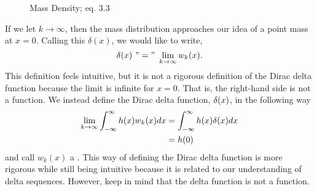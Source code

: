 \begin{figure}
    \centering
    \caption{Mass Density;  eq. 3.3}
\end{figure}

If we let \(k \rightarrow \infty\), then the mass distribution approaches our idea of a point mass at \(x=0\). Calling this \(\delta(x)\), we would like to write,
\begin{equation} \label{eq:deltaSeqLim}
    \delta(x)\ "="\ \lim_{k\rightarrow \infty} w_k(x).
\end{equation}
This definition feels intuitive, but it is not a rigorous definition of the Dirac delta function because the limit is infinite for \(x=0\). That is, the right-hand side is not a function. We instead define the Dirac delta function, \(\delta(x)\), in the following way
\begin{equation}
    \begin{split}
        \lim_{k\rightarrow \infty}\int_{-\infty}^{\infty} h(x)w_k(x)dx &= \int_{-\infty}^{\infty} h(x)\delta(x)dx \\
        &= h(0)
    \end{split}
\end{equation}
and call \(w_k(x)\) a . This way of defining the Dirac delta function is more rigorous while still being intuitive because it is related to our understanding of delta sequences. However, keep in mind that the delta function is not a function.

